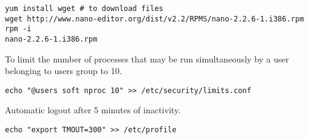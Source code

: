 \documentclass[a4paper,12pt]{article}
\begin{document}
    \begin{lstlisting}[frame=single]
yum install wget # to download files
wget http://www.nano-editor.org/dist/v2.2/RPMS/nano-2.2.6-1.i386.rpm
rpm -i 
nano-2.2.6-1.i386.rpm
    \end{lstlisting}

    To limit the number of processes that may be run simultaneously by a user belonging to users group to 10.

    \begin{lstlisting}[frame=single]
echo "@users soft nproc 10" >> /etc/security/limits.conf
    \end{lstlisting}

    Automatic logout after 5 minutes of inactivity.
    \begin{lstlisting}[frame=single]
echo "export TMOUT=300" >> /etc/profile
    \end{lstlisting}
\end{document}
